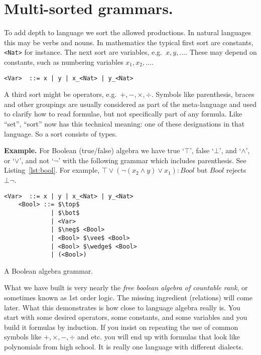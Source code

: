 



\section{Multi-sorted grammars.} 
To add depth to language we sort the allowed productions.  In natural languages 
this may be verbs and nouns.  In mathematics the typical  first sort are constants,
\lstinline{<Nat>} for instance.  The next sort are variables, e.g.\
$x,y,\ldots$. These may depend on constants, such as numbering variables
$x_1, x_2,\ldots$.
\begin{center}
    \lstinline{<Var>  ::= x | y | x_<Nat> | y_<Nat>}
\end{center}
A third sort might be operators, e.g.\ $+,-,\times,\div$.
Symbols like parenthesis, braces and other groupings are usually considered as part of 
the meta-language and used to clarify how to read formulae, but not specifically part of any formula.
Like ``set'', ``sort'' now has this technical meaning: one of these designations in that language.
So a sort consists of types.

\medskip

\noindent\textbf{Example.}
For Boolean (true/false) algebra we have true `$\top$', false `$\bot$', 
and `$\wedge$', or `$\vee$', and not `$\neg$' with the following grammar
which includes parenthesis. See Listing~\ref{lst:bool}.
For example, $\top \vee (\neg(x_2\wedge y)\vee x_1):Bool$ but $Bool$ rejects $\bot\neg$.
\begin{lstfloat}[!hbtp]
\begin{lstlisting}[mathescape]
    <Var>  ::= x | y | x_<Nat> | y_<Nat>
    <Bool> ::= $\top$ 
             | $\bot$ 
             | <Var>
             | $\neg$ <Bool> 
             | <Bool> $\vee$ <Bool> 
             | <Bool> $\wedge$ <Bool>
             | (<Bool>)
\end{lstlisting}
\caption{A Boolean algebra grammar.}\label{lst:bool}
\end{lstfloat}

What we have built is very nearly the \emph{free boolean algebra of countable rank}, or 
sometimes known as 1st order logic. The missing ingredient (relations) will come later.
What this demonstrates is how close to language algebra really is.  You start with some desired 
operators, some constants, and some variables and you build it formulas by induction.
If you insist on repeating the use of common symbols like $+,\times,-,\div$ and etc. 
you will end up with formulas that look like polynomials from high school.  It is really one language with 
different dialects.


